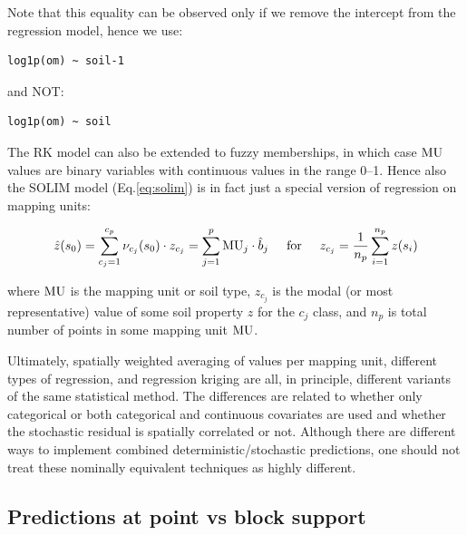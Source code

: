 \documentclass[graybox,natbib,nospthms,UStrade]{svmono}
\begin{document}
Note that this equality can be observed only if we remove the intercept
from the regression model, hence we use:

\begin{verbatim}
log1p(om) ~ soil-1
\end{verbatim}

and NOT:

\begin{verbatim}
log1p(om) ~ soil
\end{verbatim}

The RK model can also be extended to fuzzy memberships, in which case
\({\rm{MU}}\) values are binary variables with continuous values in the
range 0--1. Hence also the SOLIM model (Eq.\eqref{eq:solim}) is in fact just
a special version of regression on mapping units:

\begin{equation}
\hat z({{s}}_0 ) = \sum\limits_{c_j = 1}^{c_p} {\nu _{c_j} ({{s}}_0) \cdot z_{c_j} } = \sum\limits_{j = 1}^p { {\rm{MU}}_j \cdot \hat b_j}  \hspace{.5cm} {\rm {for}}  \hspace{.5cm}  z_{c_j} = \frac{1}{{n_p }}\sum\limits_{i = 1}^{n_p } {z({{s}}_i )}
\label{eq:SOLIMreg}
\end{equation}

where \({\rm{MU}}\) is the mapping unit or soil type, \(z_{c_j}\) is the
modal (or most representative) value of some soil property \(z\) for the
\(c_j\) class, and \(n_p\) is total number of points in some mapping unit
\({\rm{MU}}\).

Ultimately, spatially weighted averaging of values per mapping unit,
different types of regression, and regression kriging are all, in
principle, different variants of the same statistical method. The
differences are related to whether only categorical or both categorical
and continuous covariates are used and whether the stochastic residual
is spatially correlated or not. Although there are different ways to
implement combined deterministic/stochastic predictions, one should not
treat these nominally equivalent techniques as highly different.

\hypertarget{block-support}{%
\subsection{Predictions at point vs block support}\label{block-support}}
\end{document}
